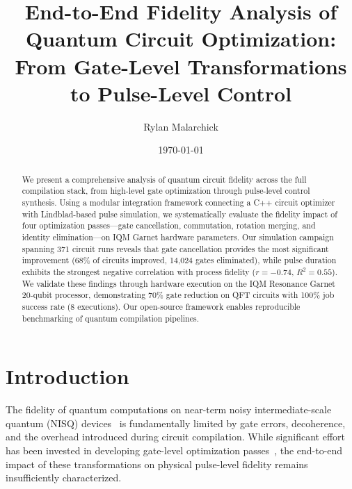\documentclass[twocolumn,showpacs,preprintnumbers,amsmath,amssymb,prb]{revtex4-2}
\begin{document}
\title{End-to-End Fidelity Analysis of Quantum Circuit Optimization:\\From Gate-Level Transformations to Pulse-Level Control}

\author{Rylan Malarchick}

\date{\today}

\begin{abstract}
We present a comprehensive analysis of quantum circuit fidelity across the full compilation stack, from high-level gate optimization through pulse-level control synthesis. Using a modular integration framework connecting a C++ circuit optimizer with Lindblad-based pulse simulation, we systematically evaluate the fidelity impact of four optimization passes---gate cancellation, commutation, rotation merging, and identity elimination---on IQM Garnet hardware parameters. Our simulation campaign spanning 371 circuit runs reveals that gate cancellation provides the most significant improvement (68\% of circuits improved, 14,024 gates eliminated), while pulse duration exhibits the strongest negative correlation with process fidelity ($r = -0.74$, $R^2 = 0.55$). We validate these findings through hardware execution on the IQM Resonance Garnet 20-qubit processor, demonstrating 70\% gate reduction on QFT circuits with 100\% job success rate (8 executions). Our open-source framework enables reproducible benchmarking of quantum compilation pipelines.
\end{abstract}

\maketitle

\section{Introduction}
\label{sec:introduction}

The fidelity of quantum computations on near-term noisy intermediate-scale quantum (NISQ) devices~\cite{preskill2018quantum} is fundamentally limited by gate errors, decoherence, and the overhead introduced during circuit compilation. While significant effort has been invested in developing gate-level optimization passes~\cite{nam2018automated,kissinger2020reducing}, the end-to-end impact of these transformations on physical pulse-level fidelity remains insufficiently characterized.
\end{document}

